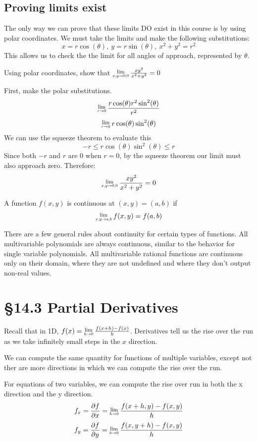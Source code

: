 \documentclass[12 pt]{article}
\begin{document}
        \subsection{Proving limits exist}

        The only way we can prove that these limits DO exist in this course is by using polar coordinates. We must take the limits and make the following substitutions:
        $$x=r\cos(\theta),\ y=r\sin(\theta),\ x^2+y^2=r^2$$
        This allows us to check the the limit for all angles of approach, represented by $\theta$.
        \begin{exmp*}
            Using polar coordinates, show that $\Lim{x,y\rightarrow 0,0} \frac{xy^2}{x^2+y^2}=0$

            First, make the polar substitutions.
            $$\Lim{r\rightarrow 0}\frac{r\cos(\theta)r^2\sin^2(\theta)}{r^2}$$
            $$\Lim{r\rightarrow 0}r\cos(\theta)\sin^2(\theta)$$
            We can use the squeeze theorem to evaluate this
            $$-r\leq r\cos(\theta)\sin^2(\theta)\leq r$$
            Since both $-r$ and $r$ are 0 when $r=0$, by the squeeze theorem our limit must also approach zero. Therefore:
            $$\Lim{x,y\rightarrow 0,0}\frac{xy^2}{x^2+y^2}=0$$
        \end{exmp*}
        \begin{def*}A function $f(x,y)$ is continuous at $(x,y)=(a,b)$ if
            $$\Lim{x,y\rightarrow a,b}f(x,y)=f(a,b)$$
        \end{def*}
        There are a few general rules about continuity for certain types of functions. All multivariable polynomials are always continuous, similar to the behavior for single variable polynomials. All multivariable rational functions are continuous only on their domain, where they are not undefined and where they don't output non-real values.
    \section{\S 14.3 Partial Derivatives}
        Recall that in 1D, $f(x)=\Lim{h\rightarrow 0}\frac{f(x+h)-f(x)}{h}$.
        Derivatives tell us the rise over the run as we take infinitely small steps in the $x$ direction.

        We can compute the same quantity for functions of multiple variables, except not ther are more directions in which we can compute the rise over the run.

        For equations of two variables, we can compute the rise over run in both the x direction and the y direction.
        $$f_x=\frac{\partial f}{\partial x}=\Lim{h\rightarrow 0}\frac{f(x+h,y)-f(x,y)}{h}$$
        $$f_y=\frac{\partial f}{\partial y}=\Lim{h\rightarrow 0}\frac{f(x,y+h)-f(x,y)}{h}$$
\end{document}
